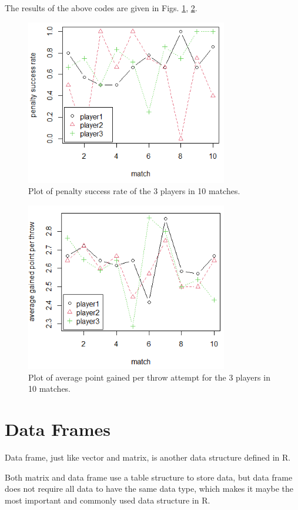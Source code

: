 The results of the above codes are given in Figs. \ref{ch:r1:fig:basket_exp1}, \ref{ch:r1:fig:basket_exp2}.

\begin{figure}
	\centering
	\includegraphics[width=250pt]{chapters/ch-r/figures/basket_exp1.png}
	\caption{Plot of penalty success rate of the 3 players in 10 matches.} \label{ch:r1:fig:basket_exp1}
\end{figure}

\begin{figure}
	\centering
	\includegraphics[width=250pt]{chapters/ch-r/figures/basket_exp2.png}
	\caption{Plot of average point gained per throw attempt for the 3 players in 10 matches.} \label{ch:r1:fig:basket_exp2}
\end{figure}

\section{Data Frames} \label{ch:r1:sec:df}

Data frame, just like vector and matrix, is another data structure defined in R.

Both matrix and data frame use a table structure to store data, but data frame does not require all data to have the same data type, which makes it maybe the most important and commonly used data structure in R.

